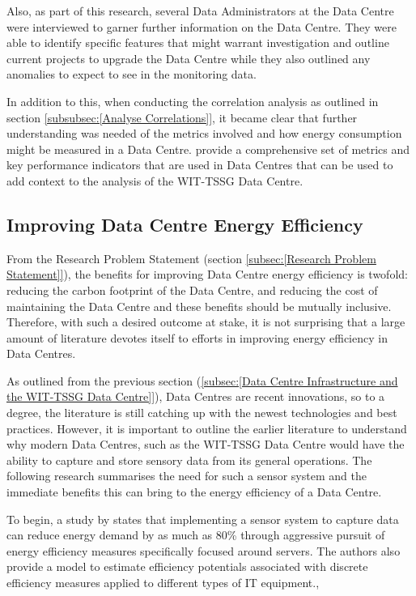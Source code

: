 \documentclass[12pt]{scrartcl}
\begin{document}
Also, as part of this research, several Data Administrators at the Data Centre were interviewed to garner further information on the Data Centre. They were able to identify specific features that might warrant investigation and outline current projects to upgrade the Data Centre while they also outlined any anomalies to expect to see in the monitoring data.  

In addition to this, when conducting the correlation analysis as outlined in section \ref{subsubsec:[Analyse Correlations]}, it became clear that further understanding was needed of the metrics involved and how energy consumption might be measured in a Data Centre. \citet{edseee.792155120170101} provide a comprehensive set of metrics and key performance indicators that are used in Data Centres that can be used to add context to the analysis of the WIT-TSSG Data Centre. 


\subsection{Improving Data Centre Energy Efficiency}
\label{subsec:[Improving Data Centre Energy Efficiency]}

From the Research Problem Statement (section \ref{subsec:[Research Problem Statement]}), the benefits for improving Data Centre energy efficiency is twofold: reducing the carbon footprint of the Data Centre, and reducing the cost of maintaining the Data Centre and these benefits should be mutually inclusive. Therefore, with such a desired outcome at stake, it is not surprising that a large amount of literature devotes itself to efforts in improving energy efficiency in Data Centres.

As outlined from the previous section (\ref{subsec:[Data Centre Infrastructure and the WIT-TSSG Data Centre]}), Data Centres are recent innovations, so to a degree, the literature is still catching up with the newest technologies and best practices. However, it is important to outline the earlier literature to understand why modern Data Centres, such as the WIT-TSSG Data Centre would have the ability to capture and store sensory data from its general operations. The following research summarises the need for such a sensor system and the immediate benefits this can bring to the energy efficiency of a Data Centre.   

To begin, a study by \citet{edsbas.A50BA51A20120101} states that implementing a sensor system to capture data can reduce energy demand by as much as 80\% through aggressive pursuit of energy efficiency measures specifically focused around servers. The authors also provide a model to estimate efficiency potentials associated with discrete efficiency measures applied to different types of IT equipment., 
\end{document}
